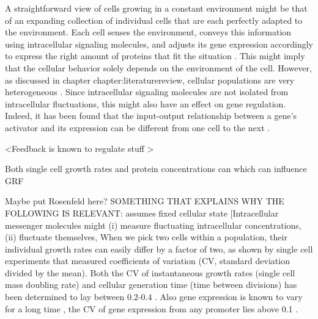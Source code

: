 A straightforward view of cells growing in a constant environment might be 
that of an expanding collection of individual cells that are each perfectly adapted to the environment.
%
Each cell senses the environment, 
conveys this information using intracellular signaling molecules, 
and adjusts its gene expression accordingly to 
express the right amount of proteins that fit the situation \cite{Bray1995, Alon2006, Alon2007, Tyson2010}.
%
This might imply that the cellular behavior solely depends on the environment of the cell.
%
However, as discussed in chapter {chapter:literaturereview}, cellular populations are very heterogeneous \cite{Kiviet2014, Hashimoto2016}.
%
Since intracellular signaling molecules are not isolated from intracellular fluctuations, 
this might also have an effect on gene regulation.
%
Indeed, it has been found that the input-output relationship between a gene's activator and its expression can be different from one cell to the next \cite{Rosenfeld2005, Keegstra2017}.

\cite{Brandman2008}
\cite{Rosenfeld2007}
\cite{Zambrano2015}
\cite{Howell2012}
\cite{Nevozhay2009}
\cite{Hornung2008}
\cite{Dublanche2006}
\cite{Becskei2000}
\cite{Swain2004}
\cite{Bowsher2013}
\cite{Avery2006}
\cite{Maheshri2007}
\cite{Levine2007a}
\cite{Bennett2008a}
\cite{Smits2006}
\cite{Balazsi2011}
\cite{Raj2008}
\cite{Davidson2008}
\cite{Elowitz2002}
\cite{Bruggeman2009}
\cite{Kitano2004a}


<Feedback is known to regulate stuff \cite{Goyal2010}>

Both single cell growth rates and protein concentrations can 
which can influence GRF

Maybe put Rosenfeld here?
SOMETHING THAT EXPLAINS WHY THE FOLLOWING IS RELEVANT:
assumes fixed cellular state
[Intracellular messenger molecules might (i) measure fluctuating intracellular concentrations, (ii) fluctuate themselves, 
%
When we pick two cells within a population, their individual growth rates can easily differ by a factor of two, 
as shown by single cell experiments that measured coefficients of variation (CV, standard deviation divided by the mean).
%
Both the CV of instantaneous growth rates (single cell mass doubling rate) and cellular generation time (time between divisions) has been determined to lay between $0.2$-$0.4$ \cite{Kiviet2014, Hashimoto2016}.
%
Also gene expression is known to vary for a long time \cite{Elowitz2002}, 
the CV of gene expression from any promoter lies above 0.1 \cite{Keren2015}.


